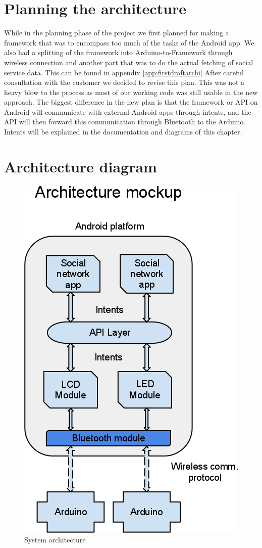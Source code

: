 \section{Planning the architecture}

While in the planning phase of the project we first planned for making a framework that was to
encompass too much of the tasks of the Android app. We also had a splitting of the framework into
Arduino-to-Framework through wireless connection and another part that was to do the actual fetching
of social service data. This can be found in appendix \ref{app:firstdraftarchi}
After careful consultation with the customer we decided to revise this plan. This was not a heavy blow
to the process as most of our working code was still usable in the new approach. The biggest difference
in the new plan is that the framework or API on Android will communicate with external Android apps through intents,
and the API will then forward this communication through Bluetooth to the Arduino. Intents will be explained
in the documentation and diagrams of this chapter.

\newpage
\section {Architecture diagram}
\begin{figure}
\centering \includegraphics[scale=0.50]{img/architecture.png}
\caption{System architecture}
\label{fig:architecture}
\end{figure}